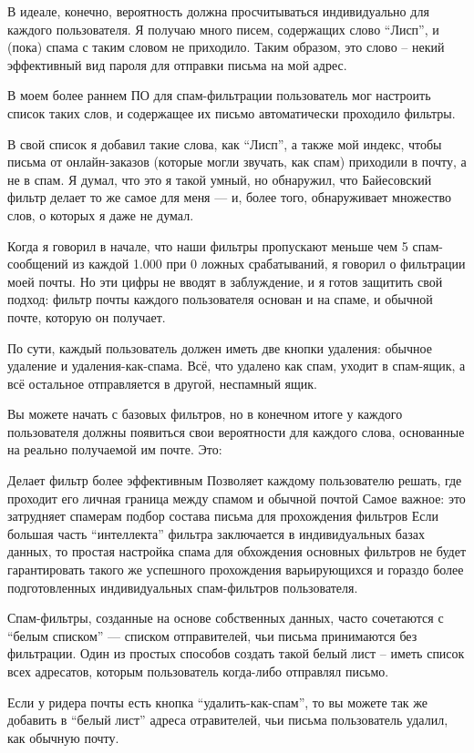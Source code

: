 \documentclass[ebook,12pt,oneside,openany]{memoir}
\begin{document}
В идеале, конечно, вероятность должна просчитываться индивидуально для
каждого пользователя. Я получаю много писем, содержащих слово “Лисп”,
и (пока) спама с таким словом не приходило. Таким образом, это слово –
некий эффективный вид пароля для отправки письма на мой адрес.

В моем более раннем ПО для спам-фильтрации пользователь мог настроить
список таких слов, и содержащее их письмо автоматически проходило
фильтры.

В свой список я добавил такие слова, как “Лисп”, а также мой индекс,
чтобы письма от онлайн-заказов (которые могли звучать, как спам)
приходили в почту, а не в спам. Я думал, что это я такой умный, но
обнаружил, что Байесовский фильтр делает то же самое для меня — и,
более того, обнаруживает множество слов, о которых я даже не думал.

Когда я говорил в начале, что наши фильтры пропускают меньше чем 5
спам-сообщений из каждой 1.000 при 0 ложных срабатываний, я говорил о
фильтрации моей почты. Но эти цифры не вводят в заблуждение, и я готов
защитить свой подход: фильтр почты каждого пользователя основан и на
спаме, и обычной почте, которую он получает.

По сути, каждый пользователь должен иметь две кнопки удаления: обычное
удаление и удаления-как-спама. Всё, что удалено как спам, уходит в
спам-ящик, а всё остальное отправляется в другой, неспамный ящик.

Вы можете начать с базовых фильтров, но в конечном итоге у каждого
пользователя должны появиться свои вероятности для каждого слова,
основанные на реально получаемой им почте. Это:

Делает фильтр более эффективным Позволяет каждому пользователю решать,
где проходит его личная граница между спамом и обычной почтой Самое
важное: это затрудняет спамерам подбор состава письма для прохождения
фильтров Если большая часть “интеллекта” фильтра заключается в
индивидуальных базах данных, то простая настройка спама для обхождения
основных фильтров не будет гарантировать такого же успешного
прохождения варьирующихся и гораздо более подготовленных
индивидуальных спам-фильтров пользователя.

Спам-фильтры, созданные на основе собственных данных, часто сочетаются
с “белым списком” — списком отправителей, чьи письма принимаются без
фильтрации. Один из простых способов создать такой белый лист – иметь
список всех адресатов, которым пользователь когда-либо отправлял
письмо.

Если у ридера почты есть кнопка “удалить-как-спам”, то вы можете так
же добавить в “белый лист” адреса отравителей, чьи письма пользователь
удалил, как обычную почту.
\end{document}
